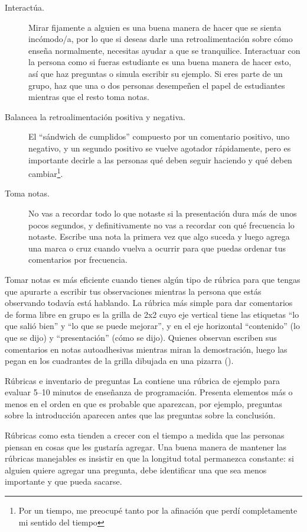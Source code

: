 \begin{description}

\item[Interactúa.]
  Mirar fijamente a alguien es una buena manera de hacer que se sienta incómodo/a,
  por lo que si deseas darle una retroalimentación sobre cómo enseña normalmente,
  necesitas ayudar a que se tranquilice.
  Interactuar con la persona como si fueras estudiante es una buena manera de hacer esto,
  así que haz preguntas o simula escribir su ejemplo.
  Si eres parte de un grupo,
  haz que una o dos personas desempeñen el papel de estudiantes
  mientras que el resto toma notas.

\item[Balancea la retroalimentación positiva y negativa.]
  El ``sándwich de cumplidos'' compuesto por un comentario positivo,
  uno negativo,
  y un segundo positivo
  se vuelve agotador rápidamente,
  pero es importante decirle a las personas qué deben seguir haciendo
  y qué deben cambiar\footnote{
    Por un tiempo,
    me preocupé tanto por la afinación que perdí completamente mi sentido del tiempo
  }.

\item[Toma notas.]
  No vas a recordar todo lo que notaste
  si la presentación dura más de unos pocos segundos,
  y definitivamente no vas a recordar con qué frecuencia lo notaste.
  Escribe una nota la primera vez que algo suceda
  y luego agrega una marca o cruz cuando vuelva a ocurrir
  para que puedas ordenar tus comentarios por frecuencia.

\end{description}

Tomar notas es más eficiente cuando tienes algún tipo de rúbrica
para que tengas que apurarte a escribir tus observaciones
mientras la persona que estás observando todavía está hablando.
La rúbrica más simple para dar comentarios de forma libre en grupo
es la grilla de 2x2 cuyo eje vertical tiene las etiquetas ``lo que salió bien'' y ``lo que se puede mejorar'',
y en el eje horizontal ``contenido'' (lo que se dijo)
y ``presentación'' (cómo se dijo).
Quienes observan escriben sus comentarios en notas autoadhesivas mientras miran la demostración,
luego las pegan en los cuadrantes de la grilla dibujada en una pizarra
().


\begin{aside}{Rúbricas e inventario de preguntas}
  La  contiene una rúbrica de ejemplo
  para evaluar 5--10 minutos de enseñanza de programación.
  Presenta elementos más o menos en el orden en que es probable que aparezcan,
  por ejemplo, preguntas sobre la introducción aparecen antes que las preguntas sobre la conclusión.

  Rúbricas como esta
  tienden a crecer con el tiempo a medida que las personas piensan en cosas que les gustaría agregar.
  Una buena manera de mantener las rúbricas manejables es insistir en que
  la longitud total permanezca constante:
  si alguien quiere agregar una pregunta,
  debe identificar una que sea menos importante y que pueda sacarse.
\end{aside}

